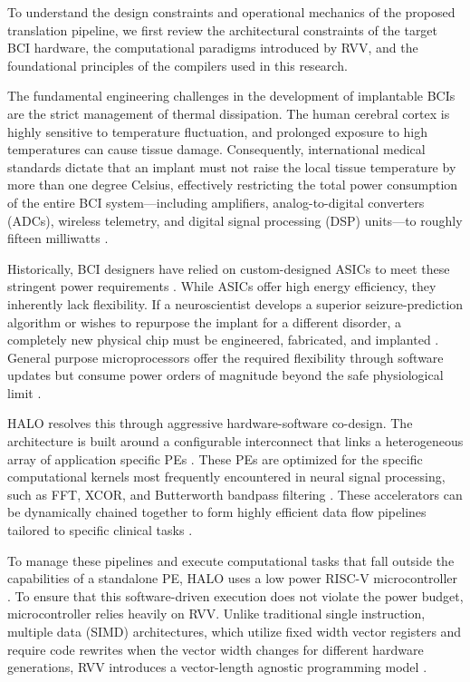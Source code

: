 To understand the design constraints and operational mechanics of the proposed translation pipeline, we first review the architectural constraints of the target BCI hardware, the computational paradigms introduced by RVV, and the foundational principles of the compilers used in this research. 

The fundamental engineering challenges in the development of implantable BCIs are the strict management of thermal dissipation. The human cerebral cortex is highly sensitive to temperature fluctuation, and prolonged exposure to high temperatures can cause tissue damage. Consequently, international medical standards dictate that an implant must not raise the local tissue temperature by more than one degree Celsius, effectively restricting the total power consumption of the entire BCI system—including amplifiers, analog-to-digital converters (ADCs), wireless telemetry, and digital signal processing (DSP) units—to roughly fifteen milliwatts \cite{10120914}.

Historically, BCI designers have relied on custom-designed ASICs to meet these stringent power requirements \cite{7982670} \cite{Musk2019} \cite{Heck2014}. While ASICs offer high energy efficiency, they inherently lack flexibility. If a neuroscientist develops a superior seizure-prediction algorithm or wishes to repurpose the implant for a different disorder, a completely new physical chip must be engineered, fabricated, and implanted \cite{9138938}. General purpose microprocessors offer the required flexibility through software updates but consume power orders of magnitude beyond the safe physiological limit \cite{10120914}.

HALO resolves this through aggressive hardware-software co-design. The architecture is built around a configurable interconnect that links a heterogeneous array of application specific PEs \cite{9138938}. These PEs are optimized for the specific computational  kernels most frequently encountered in neural signal processing, such as FFT, XCOR, and Butterworth bandpass filtering \cite{10120914}. These accelerators can be dynamically chained together to form highly efficient data flow pipelines tailored to specific clinical tasks \cite{9138938}.

To manage these pipelines and execute computational tasks that fall outside the capabilities of a standalone PE, HALO uses a low power RISC-V microcontroller \cite{9138938}. To ensure that this software-driven execution does not violate the power budget, microcontroller relies heavily on RVV. Unlike traditional single instruction, multiple data (SIMD) architectures, which utilize fixed width vector registers and require code rewrites when the vector width changes for different hardware generations, RVV introduces a vector-length agnostic programming model \cite{pipicelli2020quantum}.

